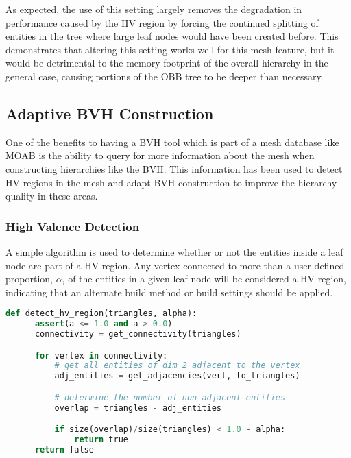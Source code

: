As expected, the use of this setting largely removes the degradation in performance
caused by the HV region by forcing the continued splitting of entities
in the tree where large leaf nodes would have been created before. This
demonstrates that altering this setting works well for this mesh feature, but it
would be detrimental to the memory footprint of the overall hierarchy in the
general case, causing portions of the OBB tree to be deeper than necessary. 


\subsection{Adaptive BVH Construction}\label{subsec:adaptive_construction}

One of the benefits to having a BVH tool which is part of a mesh database like
MOAB is the ability to query for more information about the mesh when
constructing hierarchies like the BVH. This information has been used to detect
HV regions in the mesh and adapt BVH construction to improve the
hierarchy quality in these areas.

\subsubsection{High Valence Detection}\label{subsubsec:hv_detection}

A simple algorithm is used to determine whether or not the entities inside a
leaf node are part of a HV region. Any vertex connected to more than a
user-defined proportion, $\alpha$, of the entities in a given leaf node will be
considered a HV region, indicating that an alternate build method or build
settings should be applied.

\begin{lstlisting}[language=Python,basicstyle=\tiny,caption={Algorithm for detecting HV regions.},label={alg:hv_detect},captionpos=b]
  def detect_hv_region(triangles, alpha):
      assert(a <= 1.0 and a > 0.0)
      connectivity = get_connectivity(triangles)

      for vertex in connectivity:
          # get all entities of dim 2 adjacent to the vertex
          adj_entities = get_adjacencies(vert, to_triangles)

          # determine the number of non-adjacent entities
          overlap = triangles - adj_entities

          if size(overlap)/size(triangles) < 1.0 - alpha:
              return true
      return false
\end{lstlisting}

